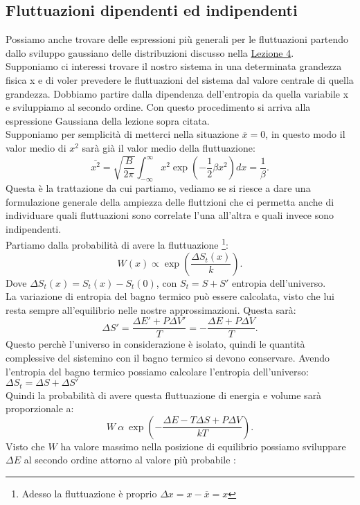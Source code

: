 \subsection{Fluttuazioni dipendenti ed indipendenti}%
Possiamo anche trovare delle espressioni più generali per le fluttuazioni partendo dallo sviluppo gaussiano delle distribuzioni discusso nella \hyperref[eq:Gauss-approx]{Lezione 4}. \\
Supponiamo ci interessi trovare il nostro sistema in una determinata grandezza fisica x e di voler prevedere le fluttuazioni del sistema dal valore centrale di quella grandezza. Dobbiamo partire dalla dipendenza dell'entropia da quella variabile x e sviluppiamo al secondo ordine. Con questo procedimento si arriva alla espressione Gaussiana della lezione sopra citata.\\
Supponiamo per semplicità di metterci nella situazione $\overline{x} = 0 $, in questo modo il valor medio di $x^2$ sarà già il valor medio della fluttuazione:
\[
	\overline{x^2}= \sqrt{\frac{B}{2\pi}} \int_{-\infty}^{\infty} x^2 \exp\left( -\frac{1}{2}\beta x^2 \right) dx = \frac{1}{\beta}
.\] 
Questa è la trattazione da cui partiamo, vediamo se si riesce a dare una formulazione generale della ampiezza delle fluttzioni che ci permetta anche di individuare quali fluttuazioni sono correlate l'una all'altra e quali invece sono indipendenti.\\
Partiamo dalla probabilità di avere la fluttuazione \footnote{Adesso la fluttuazione è proprio $\Delta x = x - \overline{x} = x$}: 
\[
	W\left( x \right) \propto \exp\left( \frac{\Delta S_{t}\left( x \right) }{k} \right) 
.\] 
Dove $\Delta S_{t}\left( x \right) = S_{t}\left( x \right) - S_{t}\left( 0 \right) $, con $S_{t} = S + S'$ entropia dell'universo. \\
La variazione di entropia del bagno termico può essere calcolata, visto che lui resta sempre all'equilibrio nelle nostre approssimazioni. Questa sarà:
\[
	\Delta S ' = \frac{\Delta E' + P \Delta V'}{T} = 
	- \frac{\Delta E + P \Delta V}{T}
.\]
Questo perchè l'universo in considerazione è isolato, quindi le quantità complessive del sistemino con il bagno termico si devono conservare. Avendo l'entropia del bagno termico possiamo calcolare l'entropia dell'universo: $\Delta S_{t} = \Delta S + \Delta S'$\\
Quindi la probabilità di avere questa fluttuazione di energia e volume sarà proporzionale a:
\[
	W \ \alpha \ \exp\left( - \frac{\Delta E -T \Delta S + P \Delta V}{kT} \right) 
.\] 
Visto che $W$ ha valore massimo nella posizione di equilibrio possiamo sviluppare $\Delta E$ al secondo ordine attorno al valore più probabile :
